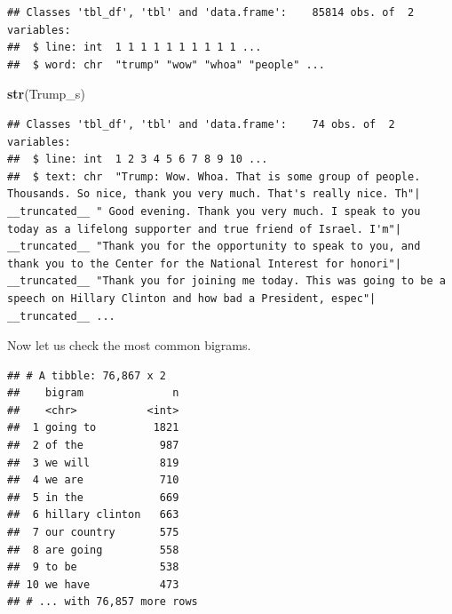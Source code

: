 \documentclass[]{article}
\newenvironment{Shaded}{\begin{snugshade}}{\end{snugshade}}
\newcommand{\KeywordTok}[1]{\textcolor[rgb]{0.13,0.29,0.53}{\textbf{#1}}}
\newcommand{\DataTypeTok}[1]{\textcolor[rgb]{0.13,0.29,0.53}{#1}}
\newcommand{\StringTok}[1]{\textcolor[rgb]{0.31,0.60,0.02}{#1}}
\newcommand{\OtherTok}[1]{\textcolor[rgb]{0.56,0.35,0.01}{#1}}
\newcommand{\OperatorTok}[1]{\textcolor[rgb]{0.81,0.36,0.00}{\textbf{#1}}}
\newcommand{\NormalTok}[1]{#1}
\begin{document}
\begin{Shaded}
\end{Shaded}

\begin{verbatim}
## Classes 'tbl_df', 'tbl' and 'data.frame':    85814 obs. of  2 variables:
##  $ line: int  1 1 1 1 1 1 1 1 1 1 ...
##  $ word: chr  "trump" "wow" "whoa" "people" ...
\end{verbatim}

\begin{Shaded}
\begin{Highlighting}[]
\KeywordTok{str}\NormalTok{(Trump_s)}
\end{Highlighting}
\end{Shaded}

\begin{verbatim}
## Classes 'tbl_df', 'tbl' and 'data.frame':    74 obs. of  2 variables:
##  $ line: int  1 2 3 4 5 6 7 8 9 10 ...
##  $ text: chr  "Trump: Wow. Whoa. That is some group of people. Thousands. So nice, thank you very much. That's really nice. Th"| __truncated__ " Good evening. Thank you very much. I speak to you today as a lifelong supporter and true friend of Israel. I'm"| __truncated__ "Thank you for the opportunity to speak to you, and thank you to the Center for the National Interest for honori"| __truncated__ "Thank you for joining me today. This was going to be a speech on Hillary Clinton and how bad a President, espec"| __truncated__ ...
\end{verbatim}

Now let us check the most common bigrams.

\begin{Shaded}
\end{Shaded}

\begin{verbatim}
## # A tibble: 76,867 x 2
##    bigram              n
##    <chr>           <int>
##  1 going to         1821
##  2 of the            987
##  3 we will           819
##  4 we are            710
##  5 in the            669
##  6 hillary clinton   663
##  7 our country       575
##  8 are going         558
##  9 to be             538
## 10 we have           473
## # ... with 76,857 more rows
\end{verbatim}
\end{document}
